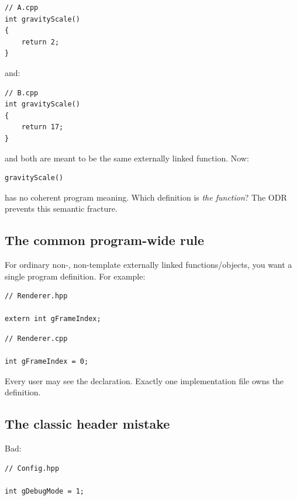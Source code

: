 \begin{verbatim}
// A.cpp
int gravityScale()
{
    return 2;
}
\end{verbatim}

and:

\begin{verbatim}
// B.cpp
int gravityScale()
{
    return 17;
}
\end{verbatim}

and both are meant to be the same externally linked function. Now:

\begin{verbatim}
gravityScale()
\end{verbatim}

has no coherent program meaning. Which definition is \emph{the function}? The ODR prevents this semantic fracture.

\subsection{The common program-wide rule}\label{01-foundations-i-ch002-the-common-program-wide-rule}

\hypertarget{01-foundations-i-ch002-the-common-program-wide-rule}{}

For ordinary non-, non-template externally linked functions/objects, you want a single program definition. For example:

\begin{verbatim}
// Renderer.hpp

extern int gFrameIndex;
\end{verbatim}

\begin{verbatim}
// Renderer.cpp

int gFrameIndex = 0;
\end{verbatim}

Every user may see the declaration. Exactly one implementation file owns the definition.

\subsection{The classic header mistake}\label{01-foundations-i-ch002-the-classic-header-mistake}

\hypertarget{01-foundations-i-ch002-the-classic-header-mistake}{}

Bad:

\begin{verbatim}
// Config.hpp

int gDebugMode = 1;
\end{verbatim}

